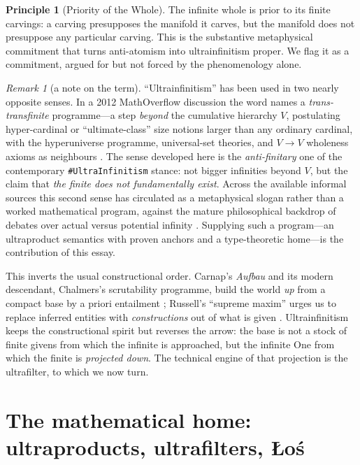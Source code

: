 \documentclass[]{article}
\theoremstyle{definition}
\newtheorem{principle}[theorem]{Principle}
\theoremstyle{remark}
\newtheorem{remark}[theorem]{Remark}
\begin{document}
\begin{principle}[Priority of the Whole]
\label{prin:bridge2}
The infinite whole is prior to its finite carvings: a carving presupposes the
manifold it carves, but the manifold does not presuppose any particular carving.
This is the substantive metaphysical commitment that turns anti-atomism into
ultrainfinitism proper. We flag it as a commitment, argued for but not forced by the
phenomenology alone.
\end{principle}

\begin{remark}[a note on the term]
\label{rem:term}
``Ultrainfinitism'' has been used in two nearly opposite senses. In a 2012
MathOverflow discussion the word names a \emph{trans-transfinite} programme---a step
\emph{beyond} the cumulative hierarchy $V$, postulating hyper-cardinal or
``ultimate-class'' size notions larger than any ordinary cardinal, with the
hyperuniverse programme, universal-set theories, and $V\!\to\!V$ wholeness axioms as
neighbours \cite{MannucciMO2012}. The sense developed here is the
\emph{anti-finitary} one of the contemporary \texttt{\#UltraInfinitism} stance: not
bigger infinities beyond $V$, but the claim that \emph{the finite does not
fundamentally exist}. Across the available informal sources this second sense
has circulated as a metaphysical slogan rather than a worked mathematical program,
against the mature philosophical backdrop of debates over actual versus potential
infinity \cite{SEPInfinity}. Supplying such a program---an ultraproduct semantics
with proven anchors and a type-theoretic home---is the contribution of this essay.
\end{remark}

This inverts the usual constructional order. Carnap's \emph{Aufbau} and its modern
descendant, Chalmers's scrutability programme, build the world \emph{up} from a
compact base by a priori entailment \cite{Carnap1928, Chalmers2012}; Russell's
``supreme maxim'' urges us to replace inferred entities with \emph{constructions}
out of what is given \cite{Russell1914}. Ultrainfinitism keeps the constructional
spirit but reverses the arrow: the base is not a stock of finite givens from which
the infinite is approached, but the infinite One from which the finite is
\emph{projected down}. The technical engine of that projection is the ultrafilter,
to which we now turn.

\section{The mathematical home: ultraproducts, ultrafilters, \L o\'s}
\label{sec:math}
\end{document}
